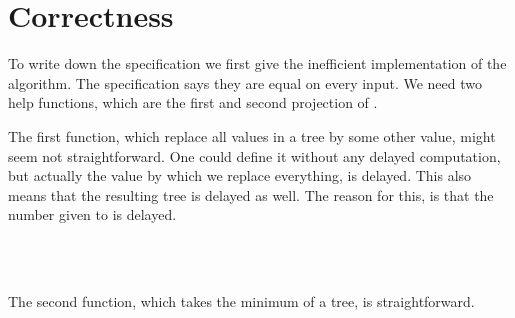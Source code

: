 \section{Correctness}
To write down the specification we first give the inefficient implementation of the algorithm.
The specification says they are equal on every input.
We need two help functions, which are the first and second projection of .

The first function, which replace all values in a tree by some other value, might seem not straightforward.
One could define it without any delayed computation, but actually the value by which we replace everything, is delayed.
This also means that the resulting tree is delayed as well.
The reason for this, is that the number given to  is delayed.

\begin{code}%
\>[0]\AgdaSpace{}%
\AgdaSymbol{:}\AgdaSpace{}%
\AgdaFunction{\&}\AgdaSymbol{(}\AgdaSpace{}%
\AgdaSpace{}%
\AgdaSpace{}%
\AgdaSpace{}%
\AgdaSpace{}%
\AgdaSpace{}%
\AgdaSymbol{)}\<%
\\
\>[0]\AgdaSpace{}%
\AgdaSymbol{(}\AgdaSpace{}%
\AgdaSymbol{)}\AgdaSpace{}%
\AgdaSpace{}%
\AgdaSymbol{=}\AgdaSpace{}%
\AgdaSpace{}%
\<%
\\
\>[0]\AgdaSpace{}%
\AgdaSymbol{(}\AgdaSpace{}%
\AgdaSpace{}%
\AgdaSymbol{)}\AgdaSpace{}%
\AgdaSpace{}%
\AgdaSymbol{=}\AgdaSpace{}%
\AgdaSpace{}%
\AgdaSymbol{(}\AgdaSpace{}%
\AgdaSpace{}%
\AgdaSymbol{)}\AgdaSpace{}%
\AgdaSymbol{(}\AgdaSpace{}%
\AgdaSpace{}%
\AgdaSymbol{)}\<%
\end{code}

The second function, which takes the minimum of a tree, is straightforward.

\begin{code}%
\>[0]\AgdaSpace{}%
\AgdaSymbol{:}\AgdaSpace{}%
\AgdaFunction{\&}\AgdaSymbol{(}\AgdaSpace{}%
\AgdaSpace{}%
\AgdaSymbol{)}\<%
\\
\>[0]\AgdaSpace{}%
\AgdaSymbol{(}\AgdaSpace{}%
\AgdaSymbol{)}\AgdaSpace{}%
\AgdaSymbol{=}\AgdaSpace{}%
\<%
\\
\>[0]\AgdaSpace{}%
\AgdaSymbol{(}\AgdaSpace{}%
\AgdaSpace{}%
\AgdaSymbol{)}\AgdaSpace{}%
\AgdaSymbol{=}\AgdaSpace{}%
\AgdaSpace{}%
\AgdaSymbol{(}\AgdaSpace{}%
\AgdaSymbol{)}\AgdaSpace{}%
\AgdaSymbol{(}\AgdaSpace{}%
\AgdaSymbol{)}\<%
\end{code}

